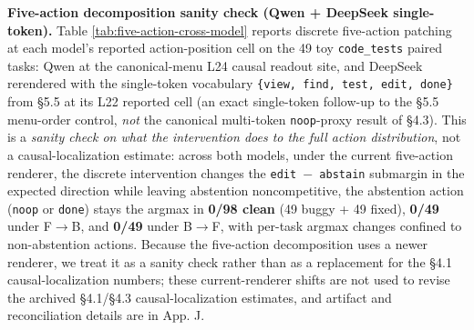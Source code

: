 \documentclass[
  11pt,
  a4paper]{article}
\begin{document}
\textbf{Five-action decomposition sanity check (Qwen + DeepSeek
single-token).} Table \ref{tab:five-action-cross-model} reports discrete
five-action patching at each model's reported action-position cell on
the 49 toy \texttt{code\_tests} paired tasks: Qwen at the canonical-menu
L24 causal readout site, and DeepSeek rerendered with the single-token
vocabulary \texttt{\{view,\ find,\ test,\ edit,\ done\}} from \S{}5.5 at
its L22 reported cell (an exact single-token follow-up to the \S{}5.5
menu-order control, \emph{not} the canonical multi-token
\texttt{noop}-proxy result of \S{}4.3). This is a \emph{sanity check on
what the intervention does to the full action distribution}, not a
causal-localization estimate: across both models, under the current
five-action renderer, the discrete intervention changes the
\texttt{edit\ \ensuremath{-}\ abstain} submargin in the expected direction while
leaving abstention noncompetitive, the abstention action (\texttt{noop}
or \texttt{done}) stays the argmax in \textbf{0/98 clean} (49 buggy + 49
fixed), \textbf{0/49} under F\ensuremath{\rightarrow}B, and \textbf{0/49} under B\ensuremath{\rightarrow}F, with
per-task argmax changes confined to non-abstention actions. Because the
five-action decomposition uses a newer renderer, we treat it as a sanity
check rather than as a replacement for the \S{}4.1 causal-localization
numbers; these current-renderer shifts are not used to revise the
archived \S{}4.1/\S{}4.3 causal-localization estimates, and artifact and
reconciliation details are in App. J.
\end{document}
